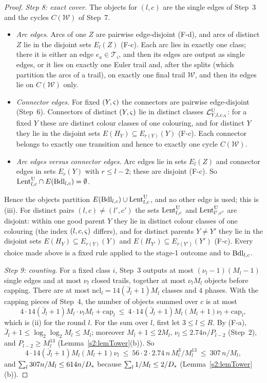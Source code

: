 \begin{proof}
\emph{Step 8: exact cover.} The objects for $(l,c)$ are the single edges of Step~3 and the cycles $C(\mathcal W)$ of Step~7.
\begin{itemize}
\item \emph{Arc edges.} Arcs of one $Z$ are pairwise edge-disjoint (F-d), and arcs of distinct $Z$ lie in the disjoint sets $E_l(Z)$ (F-c). Each arc lies in exactly one class; there it is either an edge $e_a\in\mathcal T_i$, and then its edges are output as single edges, or it lies on exactly one Euler trail and, after the splits (which partition the arcs of a trail), on exactly one final trail $\mathcal W$, and then its edges lie on $C(\mathcal W)$ only.
\item \emph{Connector edges.} For fixed $(Y,\varsigma)$ the connectors are pairwise edge-disjoint (Step~6). Connectors of distinct $(Y,\varsigma)$ lie in distinct classes $\mathcal{L}^{\mathrm{U}}_{Y,l,c,\varsigma}$: for a fixed $Y$ these are distinct colour classes of one colouring, and for distinct $Y$ they lie in the disjoint sets $E(H_Y)\subseteq E_{r(Y)}(Y)$ (F-c). Each connector belongs to exactly one transition and hence to exactly one cycle $C(\mathcal W)$.
\item \emph{Arc edges versus connector edges.} Arc edges lie in sets $E_l(Z)$ and connector edges in sets $E_r(Y)$ with $r\le l-2$; these are disjoint (F-c). So $\mathrm{Lent}^{\mathrm{U}}_{l,c}\cap E(\mathrm{Bdl}_{l,c})=\emptyset$.
\end{itemize}
Hence the objects partition $E(\mathrm{Bdl}_{l,c})\cup\mathrm{Lent}^{\mathrm{U}}_{l,c}$, and no other edge is used; this is (iii). For distinct pairs $(l,c)\ne(l',c')$ the sets $\mathrm{Lent}^{\mathrm{U}}_{l,c}$ and $\mathrm{Lent}^{\mathrm{U}}_{l',c'}$ are disjoint: within one good parent $Y$ they lie in distinct colour classes of one colouring (the index $(l,c,\varsigma)$ differs), and for distinct parents $Y\ne Y'$ they lie in the disjoint sets $E(H_Y)\subseteq E_{r(Y)}(Y)$ and $E(H_{Y'})\subseteq E_{r(Y')}(Y')$ (F-c). Every choice made above is a fixed rule applied to the stage-1 outcome and to $\mathrm{Bdl}_{l,c}$.

\emph{Step 9: counting.} For a fixed class $i$, Step~3 outputs at most $(\nu_l-1)(M_l-1)$ single edges and at most $\nu_l$ closed trails, together at most $\nu_lM_l$ objects before capping. There are at most $\mathrm{ncl}_l=14(\bar J_l+1)M_l$ classes and $4$ phases. With the capping pieces of Step~4, the number of objects summed over $c$ is at most
\[
4\cdot14(\bar J_l+1)M_l\cdot\nu_lM_l+\mathrm{cap}_l\ \le\ 4\cdot14(\bar J_l+1)M_l(M_l+1)\nu_l+\mathrm{cap}_l ,
\]
which is (ii) for the round $l$. For the sum over $l$, first let $3\le l\le R$. By (F-a), $\bar J_l+1\le\log_2\log_2M_l\le M_l$; moreover $M_l+1\le2M_l$, $\nu_l\le2.74n/P_{l-2}$ (Step~2), and $P_{l-2}\ge M_l^{13}$ (Lemma~\ref{s2:lemTower}(b)). So
\[
4\cdot14(\bar J_l+1)M_l(M_l+1)\nu_l\ \le\ 56\cdot2\cdot2.74\,n\,M_l^{3}/M_l^{13}\ \le\ 307\,n/M_l ,
\]
and $\sum_l307n/M_l\le614n/D_{*}$ because $\sum_l1/M_l\le2/D_{*}$ (Lemma~\ref{s2:lemTower}(b)).


\end{proof}

